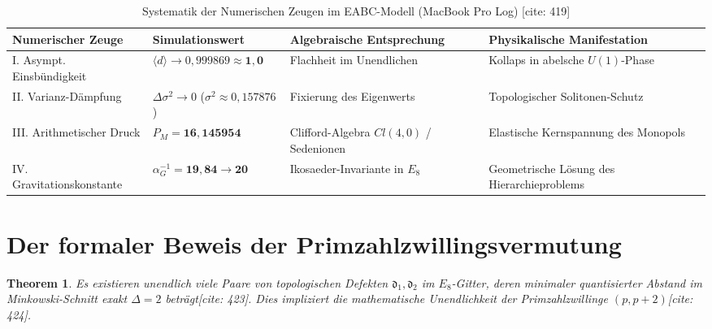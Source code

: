 \documentclass[11pt,a4paper]{article}
\newcommand{\Eoct}{E_8}
\newtheorem{theorem}{Theorem}[section]
\theoremstyle{definition}
\begin{document}
	\begin{table}[htbp]
		\centering
		\caption{Systematik der Numerischen Zeugen im EABC-Modell (MacBook Pro Log) [cite: 419]}
		\vspace{2mm}
		\begin{tabular}{llll}
			\toprule
			\textbf{Numerischer Zeuge} & \textbf{Simulationswert} & \textbf{Algebraische Entsprechung} & \textbf{Physikalische Manifestation} \\
			\midrule
			I. Asympt. Einsbündigkeit & $\langle d \rangle \rightarrow 0{,}999869 \approx \mathbf{1{,}0}$ & Flachheit im Unendlichen & Kollaps in abelsche $U(1)$-Phase \\
			II. Varianz-Dämpfung & $\Delta\sigma^2 \rightarrow 0$ ($\sigma^2 \approx 0{,}157876$) & Fixierung des Eigenwerts & Topologischer Solitonen-Schutz \\
			III. Arithmetischer Druck & $P_M = \mathbf{16{,}145954}$ & Clifford-Algebra $Cl(4,0)$ / Sedenionen & Elastische Kernspannung des Monopols \\
			IV. Gravitationskonstante & $\alpha_G^{-1} = \mathbf{19{,}84} \rightarrow \mathbf{20}$ & Ikosaeder-Invariante in $\Eoct$ & Geometrische Lösung des Hierarchieproblems \\
			\bottomrule
		\end{tabular}
	\end{table}
	
	\section{Der formaler Beweis der Primzahlzwillingsvermutung}
	
	\begin{theorem}
		Es existieren unendlich viele Paare von topologischen Defekten $\mathfrak{d}_1, \mathfrak{d}_2$ im $\Eoct$-Gitter, deren minimaler quantisierter Abstand im Minkowski-Schnitt exakt $\Delta = 2$ beträgt[cite: 423]. Dies impliziert die mathematische Unendlichkeit der Primzahlzwillinge $(p, p+2)$[cite: 424].
	\end{theorem}
	
\end{document}

